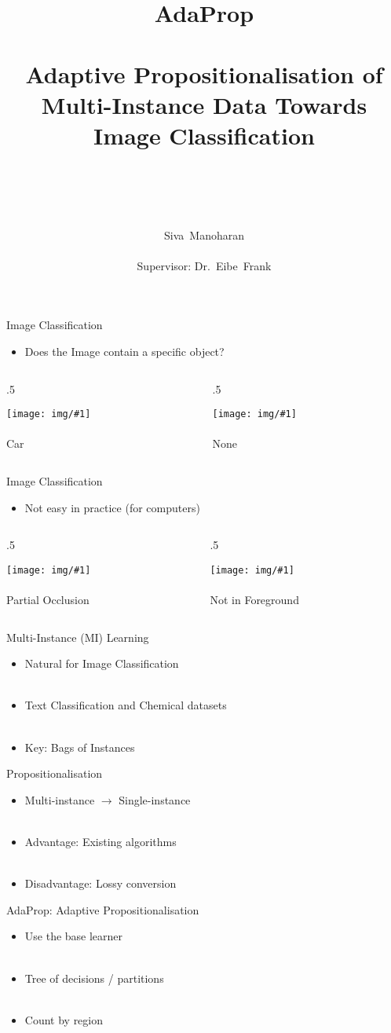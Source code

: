 \documentclass{beamer}
\title{ ~ \\ ~ \\ {\huge AdaProp} \\ ~ \\ 
    {\large Adaptive Propositionalisation of Multi-Instance Data Towards Image Classification} \\ ~ }
\subtitle{}
\author{~ \\ ~ \\ Siva~Manoharan \\ ~ \\ Supervisor: Dr.~Eibe~Frank}
\date{}
\newcommand{\ImageAndCaptionColumn}[2]{%
    \begin{center} 
        \texttt{[image: img/\#1]} \\~\\ 
        {\Large #2} 
    \end{center}
}
\newcommand{\TextAndTwoImageFrame}[5]{%
    \vspace{-0.5cm}    
    \begin{itemize}
        \item #1
    \end{itemize}    
    \vspace{-0.5cm} %
    
    \begin{columns}[T]
    
        \begin{column}{.5\textwidth}
            \ImageAndCaptionColumn{#2}{#3}
        \end{column}
        
        \begin{column}{.5\textwidth}
            \ImageAndCaptionColumn{#4}{#5}
        \end{column}
        
    \end{columns}
}
\begin{document}
{
    \makeatletter
        \def\beamer@entrycode{\vspace*{-0.8\headheight}}
    \makeatother

    \begin{frame}
        \titlepage
    \end{frame}
}

\begin{frame}{Image Classification}
    \TextAndTwoImageFrame
        {Does the Image contain a specific object?}
        {cars1}{Car}{none1}{None}
\end{frame}

\begin{frame}{Image Classification}
    \TextAndTwoImageFrame
        {Not easy in practice (for computers)}
        {cars2}{Partial Occlusion}{cars3}{Not in Foreground}
\end{frame}

\begin{frame}{Multi-Instance (MI) Learning}

    \begin{itemize}
        \item Natural for Image Classification \\ ~
        \item Text Classification and Chemical datasets \\ ~
        \item Key: Bags of Instances
    \end{itemize}
\end{frame}

\begin{frame}{Propositionalisation}

    \begin{itemize}
        \item Multi-instance $\to$ Single-instance \\ ~
        \item Advantage: Existing algorithms \\ ~
        \item Disadvantage: Lossy conversion
    \end{itemize}
\end{frame}

\begin{frame}{AdaProp: Adaptive Propositionalisation}

    \begin{itemize}
        \item Use the base learner \\ ~
        \item Tree of decisions / partitions \\ ~
        \item Count by region
    \end{itemize}

    
\end{frame}
\end{document}
